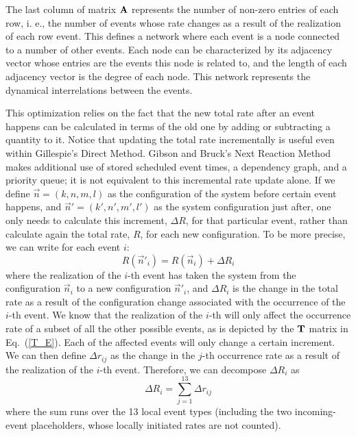 The last column of matrix ${\bf A}$ represents the number of non-zero entries of each row, i. e., the number of events whose rate changes as a result of the realization of each row event. This defines a network where each event is a node connected to a number of other events. Each node can be characterized by its adjacency vector whose entries are the events this node is related to, and the length of each adjacency vector is the degree of each node. This network represents the dynamical interrelations between the events.  
\smallskip

This optimization relies on the fact that the new total rate after an event happens can be calculated in terms of the old one by adding or subtracting a quantity to it. Notice that updating the total rate incrementally is useful even within Gillespie's Direct Method. Gibson and Bruck's Next Reaction Method makes additional use of stored scheduled event times, a dependency graph, and a priority queue; it is not equivalent to this incremental rate update alone. If we define $\vec{n} = (k, n, m, l)$ as the configuration of the system before certain event happens, and $\vec{n}'= (k', n', m', l')$ as the system configuration just after, one only needs to calculate this increment, $\Delta R$, for that particular event, rather than calculate again the total rate, $R$, for each new configuration. To be more precise, we can write for each event $i$: 
\begin{equation}
R(\vec{n}'_i) = R(\vec{n}_i) + \Delta R_i
\end{equation}
where the realization of the $i$-th event has taken the system from 
the configuration $\vec{n}_i$ to a new configuration $\vec{n}'_i$, and $\Delta R_i$ is the change in the total rate as a result of the configuration change associated with the occurrence of the $i$-th event. We know that the realization of the $i$-th will only affect the occurrence rate of a subset of all the other possible events, as is depicted by the ${\bf T}$ matrix in Eq.~(\ref{T_E}). Each of the affected events will only change a certain increment. We can then define $\Delta r_{ij}$ as the change in the $j$-th occurrence rate as a result of the realization of the $i$-th event. Therefore, we can decompose $\Delta R_i$ as
\begin{equation}
\Delta R_i = \sum_{j=1}^{13} \Delta r_{ij}
\label{DeltaR}
\end{equation}
where the sum runs over the 13 local event types (including the two incoming-event placeholders, whose locally initiated rates are not counted). 
\smallskip

